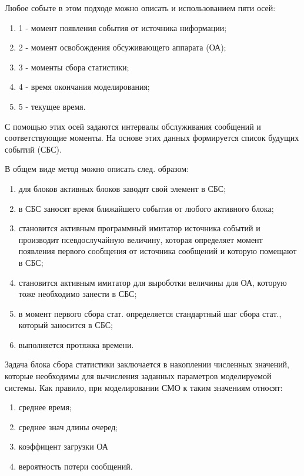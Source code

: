 Любое событе в этом подходе можно описать и использованием пяти осей:

\begin{enumerate}
	\item 1 - момент появления события от источника ниформации;
	\item 2 - момент освобождения обсуживающего аппарата (ОА);
	\item 3 - моменты сбора статистики;
	\item 4 - время окончания моделирования;
	\item 5 - текущее время.
\end{enumerate}

С помощью этих осей задаются интервалы обслуживания сообщений и соответствующие моменты.
На основе этих данных формируется список будущих событий (СБС).

В общем виде метод можно описать след. образом:
\begin{enumerate}
	\item для блоков активных блоков заводят свой элемент в СБС;
	\item в СБС заносят время ближайшего события от любого активного блока;
	\item становится активным программный имитатор источника событий и производит псевдослучайную величину, которая определяет момент появления первого сообщения от источника сообщений и которую помещают в СБС;
	\item становится активным имитатор для выроботки величины для ОА, которую тоже необходимо занести в СБС;
	\item в момент первого сбора стат. определяется стандартный шаг сбора стат., который заносится в СБС;
	\item выполняется протяжка времени.
\end{enumerate}

Задача блока сбора статистики заключается в накоплении численных значений, которые необходимы для вычисления заданных параметров моделируемой системы. Как правило, при моделировании СМО к таким значениям относят:

\begin{enumerate}
	\item среднее время; 
	\item среднее знач длины очеред; 
	\item коэффицент загрузки ОА
	\item вероятность потери сообщений.
\end{enumerate}